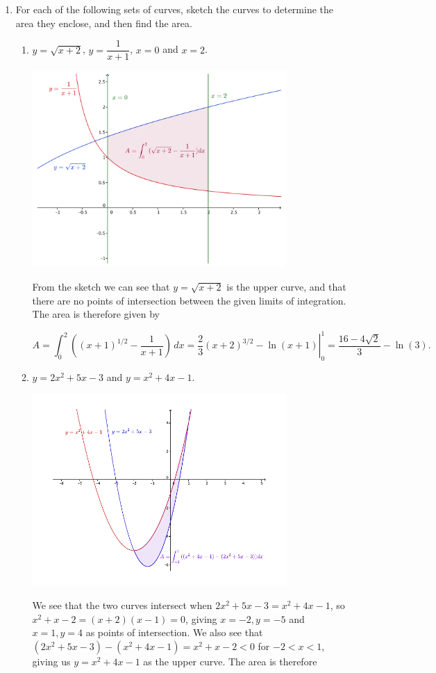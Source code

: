 \documentclass[12pt]{article}
\begin{document}
\thispagestyle{fancy}

\begin{enumerate}
 \item For each of the following sets of curves, sketch the curves to determine the area they enclose, and then find the area.
\begin{enumerate}
 \item $y=\sqrt{x+2}$, $y=\dfrac{1}{x+1}$, $x=0$ and $x=2$.

 \begin{center}
  \includegraphics[width=0.8\textwidth]{WS4-1a}
 \end{center}
From the sketch we can see that $y=\sqrt{x+2}$ is the upper curve, and that there are no points of intersection between the given limits of integration. The area is therefore given by

\[
 A = \int_0^2\left((x+1)^{1/2}-\frac{1}{x+1}\right)\,dx = \left.\frac{2}{3}(x+2)^{3/2}-\ln(x+1)\right|_0^1 = \frac{16-4\sqrt{2}}{3}-\ln(3).
\]


\newpage

 \item $y=2x^2+5x-3$ and $y=x^2+4x-1$.
 \begin{center}
  \includegraphics[width=0.8\textwidth]{WS4-1b}
 \end{center}
We see that the two curves intersect when $2x^2+5x-3=x^2+4x-1$, so $x^2+x-2=(x+2)(x-1)=0$, giving $x=-2, y=-5$ and $x=1, y=4$ as points of intersection. We also see that $(2x^2+5x-3)-(x^2+4x-1)=x^2+x-2<0$ for $-2<x<1$, giving us $y=x^2+4x-1$ as the upper curve. The area is therefore


\end{enumerate}
\end{enumerate}
\end{document}
